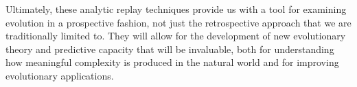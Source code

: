 Ultimately, these analytic replay techniques provide us with a tool for examining evolution in a prospective fashion, not just the retrospective approach that we are traditionally limited to.
They will allow for the development of new evolutionary theory and predictive capacity that will be invaluable, both for understanding how meaningful complexity is produced in the natural world and for improving evolutionary applications. 
